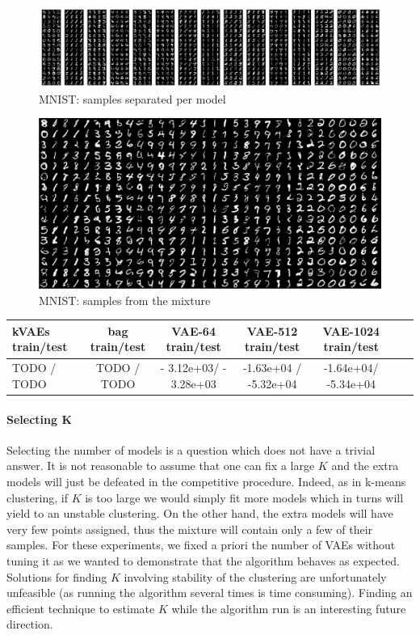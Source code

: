 \documentclass{article}
\begin{document}
\begin{figure}
\center\includegraphics[scale=0.12]{pics/mnist_comp_99.png}
\caption{MNIST: samples separated per model}\label{fig:mnist_comp}
\end{figure}
\begin{figure}
\center\includegraphics[scale=0.2]{pics/mnist_mixture_99.png}
\caption{MNIST: samples from the mixture}\label{fig:mnist_mix}
\end{figure}

\begin{table}
\begin{center}
\begin{tabular}{ l | c | c | c | c | c | c }
  kVAEs train/test & bag train/test & VAE-64 train/test &VAE-512 train/test & VAE-1024 train/test\\
  \hline
 TODO / TODO &TODO / TODO & - 3.12e+03/ - 3.28e+03 &-1.63e+04 / -5.32e+04	& -1.64e+04/ -5.34e+04 	
\end{tabular}
\end{center}
\end{table}
\paragraph{Selecting K}
Selecting the number of models is a question which does not have a trivial answer. It is not reasonable to assume that one can fix a large $K$ and the extra models will just be defeated in the competitive procedure. Indeed, as in k-means clustering, if $K$ is too large we would simply fit more models which in turns will yield to an unstable clustering. On the other hand, the extra models will have very few points assigned, thus the mixture will contain only a few of their samples. For these experiments, we fixed a priori the number of VAEs without tuning it as we wanted to demonstrate that the algorithm behaves as expected. Solutions for finding $K$ involving stability of the clustering are unfortunately unfeasible (as running the algorithm several times is time consuming). Finding an efficient technique to estimate $K$ while the algorithm run is an interesting future direction.
\clearpage
\newpage


\end{document}
